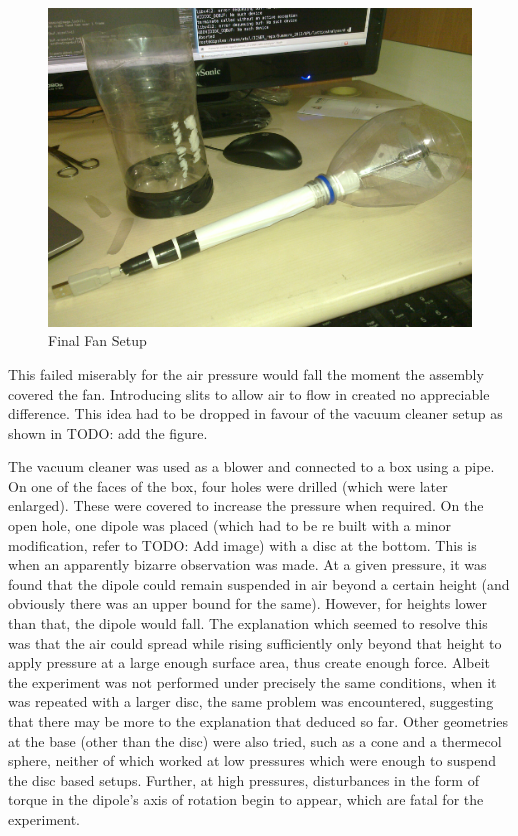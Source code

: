 \begin{enumerate}
					\begin{figure}[bth]
						\begin{center}
							\includegraphics[width=0.7\linewidth]{gfx/fanSetupActual.jpg}
						\end{center}
					\caption[Final Fan Setup]{Final Fan Setup}
					\label{fanSetupActual}
					\end{figure}
					This failed miserably for the air pressure would fall the moment the assembly covered the fan. Introducing slits to allow air to flow in created no appreciable difference. This idea had to be dropped in favour of the vacuum cleaner setup as shown in TODO: add the figure. 
					\par
					The vacuum cleaner was used as a blower and connected to a box using a pipe. On one of the faces of the box, four holes were drilled (which were later enlarged). These were covered to increase the pressure when required. On the open hole, one dipole was placed (which had to be re built with a minor modification, refer to TODO: Add image) with a disc at the bottom. This is when an apparently bizarre observation was made. At a given pressure, it was found that the dipole could remain suspended in air beyond a certain height (and obviously there was an upper bound for the same). However, for heights lower than that, the dipole would fall. The explanation which seemed to resolve this was that the air could spread while rising sufficiently only beyond that height to apply pressure at a large enough surface area, thus create enough force. Albeit the experiment was not performed under precisely the same conditions, when it was repeated with a larger disc, the same problem was encountered, suggesting that there may be more to the explanation that deduced so far. Other geometries at the base (other than the disc) were also tried, such as a cone and a thermecol sphere, neither of which worked at low pressures which were enough to suspend the disc based setups. Further, at high pressures, disturbances in the form of torque in the dipole's axis of rotation begin to appear, which are fatal for the experiment.

\end{enumerate}
